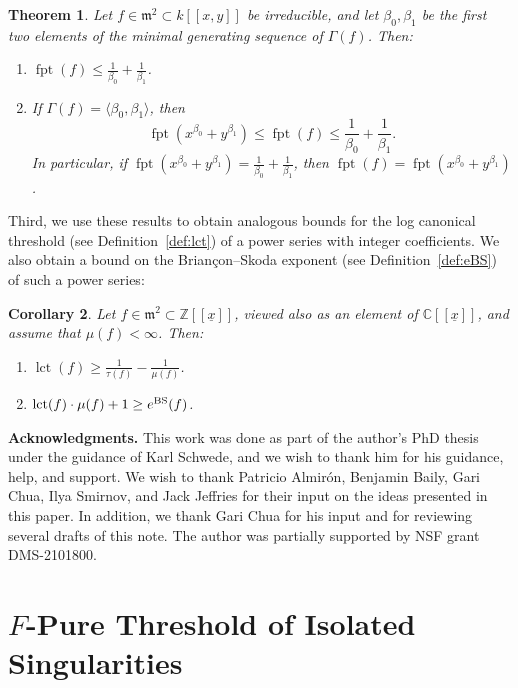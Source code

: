 \documentclass{article}
\newtheorem{theorem}{Theorem}
\newtheorem{corollary}[theorem]{Corollary}
\DeclareMathOperator{\fpt}{fpt}
\DeclareMathOperator{\lct}{lct}
\numberwithin{theorem}{section}
\begin{document}
\begin{theorem}\label{thm:semigr_fpt}
Let $f\in\mathfrak{m}^2\subset k[[x,y]]$ be irreducible, and let $\beta_0,\beta_1$ be the first two elements of the minimal generating sequence of $\Gamma(f)$. Then:
\begin{enumerate}
    \item\label{cor:beta_bound} $\fpt(f)\leq\frac{1}{\beta_0}+\frac{1}{\beta_1}$.
    \item\label{cor:two_generators} If $\Gamma(f)=\langle\beta_0,\beta_1\rangle$, then
    \[
        \fpt(x^{\beta_0}+y^{\beta_1})\leq\fpt(f)\leq
        \frac{1}{\beta_0}+\frac{1}{\beta_1}.
    \]
    In particular, if $\fpt(x^{\beta_0}+y^{\beta_1})=\frac{1}{\beta_0}+\frac{1}{\beta_1}$, then $\fpt(f)=\fpt(x^{\beta_0}+y^{\beta_1})$.
\end{enumerate}
\end{theorem}

Third, we use these results to obtain analogous bounds for the log canonical threshold (see Definition~\ref{def:lct}) of a power series with integer coefficients. We also obtain a bound on the Brian{\c{c}}on--Skoda exponent (see Definition~\ref{def:eBS}) of such a power series:

\begin{corollary}\label{corB}
Let $f\in\mathfrak{m}^2\subset\mathbb{Z}[[\underline{x}]]$, viewed also as an element of $\mathbb{C}[[\underline{x}]]$, and assume that $\mu(f)<\infty$. Then:
\begin{enumerate}
    \item\label{cor:lct_milnor} $\lct(f)\geq\frac{1}{\tau(f)}-\frac{1}{\mu(f)}$.
    \item\label{cor:ebs} $\lct(f)\cdot\mu(f)+1\geq e^{\textup{BS}}(f)$.
\end{enumerate}
\end{corollary}

\noindent\textbf{Acknowledgments.} This work was done as part of the author's PhD thesis under the guidance of Karl Schwede, and we wish to thank him for his guidance, help, and support. We wish to thank Patricio Almir\'{o}n, Benjamin Baily, Gari Chua, Ilya Smirnov, and Jack Jeffries for their input on the ideas presented in this paper. In addition, we thank Gari Chua for his input and for reviewing several drafts of this note. The author was partially supported by NSF grant DMS-2101800.

\section{$F$-Pure Threshold of Isolated Singularities}\label{chap:F-stuff}
\end{document}
